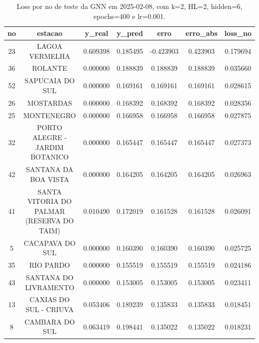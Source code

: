 \begin{table}[h]
\centering
\caption{Loss por no de teste da GNN em 2025-02-08, com k=2, HL=2, hidden=6, epochs=400 e lr=0.001.}
\label{tab:gnn_loss_k2_hl2_h6_e400_d20250208}
\begin{tabular}{ccccccc}
\toprule
no & estacao & y\_real & y\_pred & erro & erro\_abs & loss\_no \\
\midrule
23 & LAGOA VERMELHA & 0.609398 & 0.185495 & -0.423903 & 0.423903 & 0.179694 \\
36 & ROLANTE & 0.000000 & 0.188839 & 0.188839 & 0.188839 & 0.035660 \\
52 & SAPUCAIA DO SUL & 0.000000 & 0.169161 & 0.169161 & 0.169161 & 0.028615 \\
26 & MOSTARDAS & 0.000000 & 0.168392 & 0.168392 & 0.168392 & 0.028356 \\
25 & MONTENEGRO & 0.000000 & 0.166958 & 0.166958 & 0.166958 & 0.027875 \\
32 & PORTO ALEGRE - JARDIM BOTANICO & 0.000000 & 0.165447 & 0.165447 & 0.165447 & 0.027373 \\
42 & SANTANA DA BOA VISTA & 0.000000 & 0.164205 & 0.164205 & 0.164205 & 0.026963 \\
41 & SANTA VITORIA DO PALMAR (RESERVA DO TAIM) & 0.010490 & 0.172019 & 0.161528 & 0.161528 & 0.026091 \\
5 & CACAPAVA DO SUL & 0.000000 & 0.160390 & 0.160390 & 0.160390 & 0.025725 \\
35 & RIO PARDO & 0.000000 & 0.155519 & 0.155519 & 0.155519 & 0.024186 \\
43 & SANTANA DO LIVRAMENTO & 0.000000 & 0.153005 & 0.153005 & 0.153005 & 0.023411 \\
13 & CAXIAS DO SUL - CRIUVA & 0.053406 & 0.189239 & 0.135833 & 0.135833 & 0.018451 \\
8 & CAMBARA DO SUL & 0.063419 & 0.198441 & 0.135022 & 0.135022 & 0.018231 \\
\bottomrule
\end{tabular}
\end{table}
